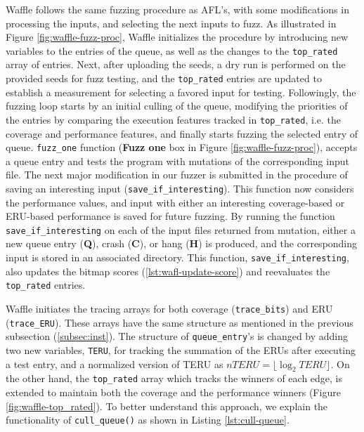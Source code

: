Waffle follows the same fuzzing procedure as AFL's, with some modifications in processing the inputs, and selecting the next inputs to fuzz. As illustrated in Figure \ref{fig:waffle-fuzz-proc}, Waffle initializes the procedure by introducing new variables to the entries of the queue, as well as the changes to the \texttt{top\_rated} array of entries. Next, after uploading the seeds, a dry run is performed on the provided seeds for fuzz testing, and the \texttt{top\_rated} entries are updated to establish a measurement for selecting a favored input for testing. Followingly, the fuzzing loop starts by an initial culling of the queue, modifying the priorities of the entries by comparing the execution features tracked in \texttt{top\_rated}, i.e. the coverage and performance features, and finally starts fuzzing the selected entry of queue. \texttt{fuzz\_one} function (\textbf{Fuzz one} box in Figure \ref{fig:waffle-fuzz-proc}), accepts a queue entry and tests the program with mutations of the corresponding input file. The next major modification in our fuzzer is submitted in the procedure of saving an interesting input (\texttt{save\_if\_interesting}). This function now considers the performance values, and input with either an interesting coverage-based or ERU-based performance is saved for future fuzzing. By running the function \texttt{save\_if\_interesting} on each of the input files returned from mutation, either a new queue entry (\textbf{Q}), crash (\textbf{C}), or hang (\textbf{H}) is produced, and the corresponding input is stored in an associated directory. This function, \texttt{save\_if\_interesting}, also updates the bitmap scores (\ref{lst:wafl-update-score}) and reevaluates the \texttt{top\_rated} entries.




Waffle initiates the tracing arrays for both coverage (\texttt{trace\_bits}) and ERU (\texttt{trace\_ERU}). These arrays have the same structure as mentioned in the previous subsection (\ref{subsec:inst}). The structure of \texttt{queue\_entry}'s is changed by adding two new variables, \texttt{TERU}, for tracking the summation of the ERUs after executing a test entry, and a normalized version of TERU as $nTERU= \lfloor \log_{2} {TERU}\rfloor$. On the other hand, the \texttt{top\_rated} array which tracks the winners of each edge, is extended to maintain both the coverage and the performance winners (Figure \ref{fig:waffle-top_rated}). To better understand this approach, we explain the functionality of \texttt{cull\_queue()} as shown in Listing \ref{lst:cull-queue}.

